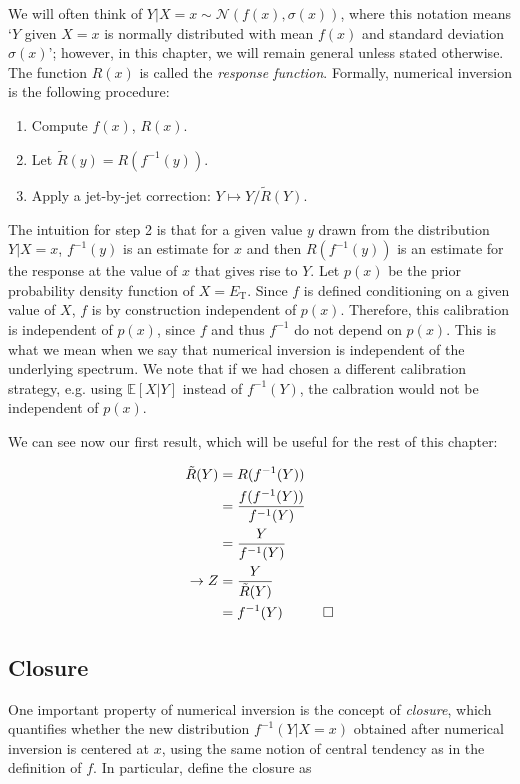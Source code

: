 We will often think of $Y|X=x\sim \mathcal{N}(f(x),\sigma(x))$, where this notation means `$Y$ given $X=x$ is normally distributed with mean $f(x)$ and standard deviation $\sigma(x)$'; however, in this chapter, we will remain general unless stated otherwise.  The function $R(x)$ is called the {\it response function}.  Formally, numerical inversion is the following procedure:

\begin{enumerate}
\item Compute $f(x)$, $R(x)$.  
\item Let $\tilde{R}(y) = R(f^{-1}(y))$.
\item Apply a jet-by-jet correction: $Y\mapsto Y/\tilde{R}(Y)$.
\end{enumerate}

The intuition for step 2 is that for a given value $y$ drawn from the distribution $Y|X=x$, $f^{-1}(y)$ is an estimate for $x$ and then $R(f^{-1}(y))$ is an estimate for the response at the value of $x$ that gives rise to $Y$.
Let $p(x)$ be the prior probability density function of $X=E_\text{T}$.
Since $f$ is defined conditioning on a given value of $X$, $f$ is by construction independent of $p(x)$.
Therefore, this calibration is independent of $p(x)$, since $f$ and thus $f^{-1}$ do not depend on $p(x)$.
This is what we mean when we say that numerical inversion is independent of the underlying spectrum.
We note that if we had chosen a different calibration strategy, e.g. using $\mathbb{E}[X|Y]$ instead of $f^{-1}(Y)$, the calbration would not be independent of $p(x)$.

We can see now our first result, which will be useful for the rest of this chapter:
\vspace{6mm}


\begin{align}
\tilde{R}(Y) &= R(f^{-1}(Y))\nonumber\\
&= \frac{f(f^{-1}(Y))}{f^{-1}(Y)}\nonumber\\
&= \frac{Y}{f^{-1}(Y)}\nonumber\\
\rightarrow Z &= \frac{Y}{\tilde{R}(Y)}\nonumber\\
&= f^{-1}(Y) \hspace{1 cm} \Box
\end{align}

\subsection{Closure}
\label{sec:NI:introclosure}
One important property of numerical inversion is the concept of {\it closure}, which quantifies whether the new distribution $f^{-1}(Y|X=x)$ obtained after numerical inversion is centered at $x$, using the same notion of central tendency as in the definition of $f$.  In particular, define the closure as

